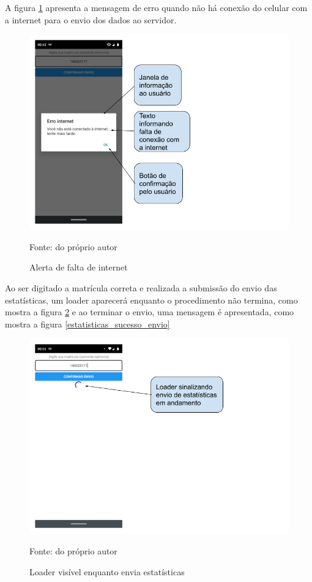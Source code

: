 A figura \ref{sem_internet} apresenta a mensagem de erro quando não há conexão do celular com a internet para o envio dos dados ao servidor.

\begin{figure}[H]
\centering
\caption{Alerta de falta de internet}
\includegraphics[scale=0.5]{figuras/estatisticas/sem_internet.png}

\label{sem_internet}
\small{Fonte: do próprio autor}
\end{figure}

Ao ser digitado a matrícula correta e realizada a submissão do envio das estatísticas, um loader aparecerá enquanto o procedimento não termina, como mostra a figura \ref{loader} e ao terminar o envio, uma mensagem é apresentada, como mostra a figura \ref{estatisticas_sucesso_envio}

\begin{figure}[H]
\centering
\caption{Loader visível enquanto envia estatísticas}
\includegraphics[scale=0.5]{figuras/estatisticas/loader_estatisticas.png}

\label{loader}
\small{Fonte: do próprio autor}
\end{figure}


